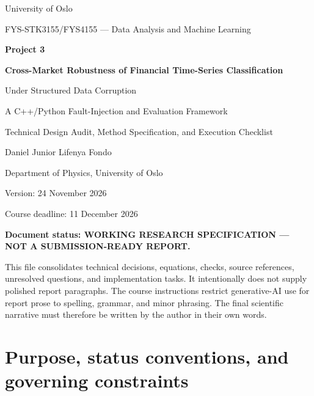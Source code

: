 \documentclass[11pt,a4paper]{article}
\begin{document}
\begin{titlepage}
\centering
\vspace*{18mm}
{\Large University of Oslo\par}
\vspace{2mm}
{\large FYS-STK3155/FYS4155 --- Data Analysis and Machine Learning\par}
\vspace{18mm}
{\huge\bfseries Project 3\par}
\vspace{5mm}
{\LARGE\bfseries Cross-Market Robustness of Financial Time-Series Classification\par}
\vspace{3mm}
{\Large Under Structured Data Corruption\par}
\vspace{4mm}
{\large A C++/Python Fault-Injection and Evaluation Framework\par}
\vspace{16mm}
{\large Technical Design Audit, Method Specification, and Execution Checklist\par}
\vfill
{\large Daniel Junior Lifenya Fondo\par}
{\normalsize Department of Physics, University of Oslo\par}
\vspace{5mm}
{\normalsize Version: 24 November 2026\par}
{\normalsize Course deadline: 11 December 2026\par}
\vfill
\begin{tcolorbox}[width=0.92\textwidth,colback=yellow!8,colframe=orange!65!black]
\centering\textbf{Document status: WORKING RESEARCH SPECIFICATION --- NOT A SUBMISSION-READY REPORT.}

This file consolidates technical decisions, equations, checks, source references, unresolved questions, and implementation tasks. It intentionally does not supply polished report paragraphs. The course instructions restrict generative-AI use for report prose to spelling, grammar, and minor phrasing. The final scientific narrative must therefore be written by the author in their own words.
\end{tcolorbox}
\end{titlepage}

\tableofcontents
\newpage

\section{Purpose, status conventions, and governing constraints}
\label{sec:purpose}
\end{document}
